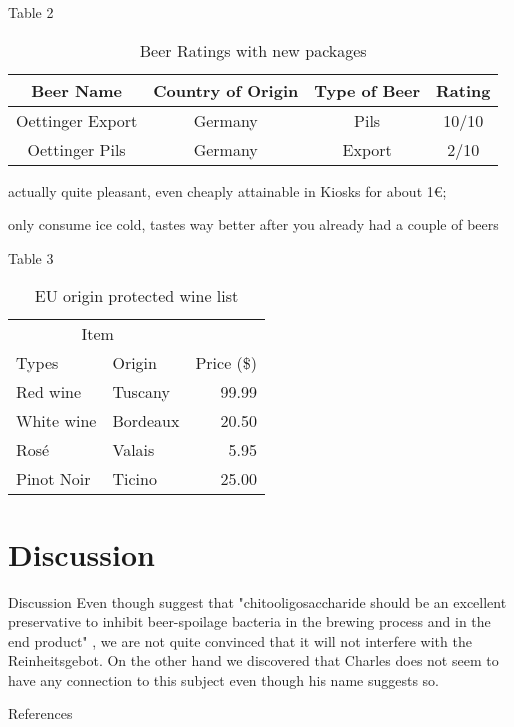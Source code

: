 \documentclass[10pt]{beamer}
\begin{document}
\begin{frame}{Table 2}
\begin{table}[h]
\begin{center}
\begin{threeparttable}
\begin{tabular}{c c c c}
    \toprule
    \textbf{Beer Name} & \textbf{Country of Origin} & \textbf{Type of Beer} & \textbf{Rating} \\ 
    \midrule
      Oettinger Export\tnote{1}   & Germany & Pils & 10/10 \\
      Oettinger Pils\tnote{2}   & Germany & Export & 2/10 \\ 
      \bottomrule
\end{tabular}
\begin{tablenotes}
\item[1] \footnotesize actually quite pleasant, even cheaply attainable in Kiosks for about 1€; \item[2] \footnotesize only consume ice cold, tastes way better after you already had a couple of beers
\end{tablenotes}
\end{threeparttable}
\end{center}
\caption{Beer Ratings with new packages}{}
\label{table:2}
\end{table}
\end{frame}

\begin{frame}{Table 3}
\begin{table}[h]
\centering
\begin{tabular}{llr}
\hline
\multicolumn{2}{c}{Item} \\
\cline{1-2}
Types    & Origin & Price (\$) \\
\hline
Red wine      & Tuscany     & 99.99      \\
White wine       & Bordeaux     & 20.50      \\
Rosé       & Valais     & 5.95      \\
Pinot Noir & Ticino      & 25.00       \\
\hline
\end{tabular}
\caption{EU origin protected wine list}
 \label{table:3}
\end{table}
\end{frame}

\section{Discussion}
\begin{frame}{Discussion}
Even though \cite{Zhao2015} suggest that "chitooligosaccharide should be an excellent preservative to inhibit beer-spoilage bacteria in the brewing process and in the end product" , we are not quite convinced that it will not interfere with the Reinheitsgebot. On the other hand we discovered that Charles \cite{Beer2003} does not seem to have any connection to this subject even though his name suggests so.
\end{frame} 


\begin{frame}[allowframebreaks]{References}

  \printbibliography

\end{frame}
\end{document}
